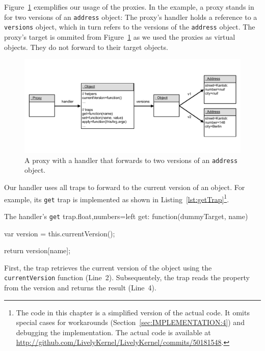 Figure~\ref{fig:VersioningProxy} exemplifies our usage of the proxies.
In the example, a proxy stands in for two versions of an \lstinline{address} object: The proxy's handler holds a reference to a \lstinline{versions} object, which in turn refers to the versions of the \lstinline{address} object.
The proxy's target is ommited from Figure~\ref{fig:VersioningProxy} as we used the proxies as virtual objects.
They do not forward to their target objects.

\begin{figure}[h]
    \centering
    \includegraphics[width=\textwidth]{figures/5_implementation/2_versioningProxy.pdf}
    \caption{A proxy with a handler that forwards to two versions of an \lstinline{address} object.}
    \label{fig:VersioningProxy}
\end{figure}

Our handler uses all traps to forward to the current version of an object.
For example, its \lstinline{get} trap is implemented as shown in Listing~\ref{lst:getTrap}\footnote{The code in this chapter is a simplified version of the actual code. It omits special cases for workarounds (Section~\ref{sec:IMPLEMENTATION:4}) and debugging the implementation. The actual code is available at \url{http://github.com/LivelyKernel/LivelyKernel/commits/50181548}.}.

\begin{code}{The handler's \lstinline{get} trap.}{float,numbers=left}
get: function(dummyTarget, name) {
    var version = this.currentVersion();
    
    return version[name];
}
\end{code}
\iffalse
\end{verbatim}\fi

First, the trap retrieves the current version of the object using the \lstinline{currentVersion} function (Line~2).
Subsequentely, the trap reads the property from the version and returns the result (Line~4).

